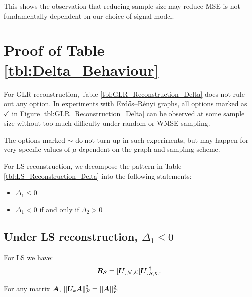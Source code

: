 This shows the observation that reducing sample size may reduce MSE is not fundamentally dependent on our choice of signal model.
\fi
\section{Proof of Table \ref{tbl:Delta_Behaviour}}
\label{app:table_delta_proof}
{\color{black}
For GLR reconstruction, Table \ref{tbl:GLR_Reconstruction_Delta} does not rule out any option. In experiments with Erdős–Rényi graphs, all options marked as $\checkmark$ in Figure \ref{tbl:GLR_Reconstruction_Delta} can be observed at some sample size without too much difficulty under random or WMSE sampling.

The options marked $\sim$ do not turn up in such experiments, but may happen for very specific values of $\mu$ dependent on the graph and sampling scheme.

For LS reconstruction, we decompose the pattern in Table \ref{tbl:LS_Reconstruction_Delta} into the following statements: 
\begin{itemize}
    \item $\Delta_{1} \leq 0$
    \item $\Delta_{1} < 0 $ if and only if $ \Delta_{2} > 0$
\end{itemize}
}
\subsection{Under LS reconstruction, \texorpdfstring{$\Delta_{1} \leq 0$}{\textDelta\textoneinferior =< 0}}
\label{app:delta_1_non_positive}
For LS we have:  \[\matr{R}_{\set{S}} = \matrsubU{N}[\matr{U}]_{\set{S},\set{K}}^{\dagger}.\]

\iffalse
\begin{lemma}
\label{lemma:frob_orthog}
    For any matrix $\bm{A}$, $||\bm{U}_{k}\bm{A}||^{2}_{F} = ||\bm{A}||^{2}_{F}$
\end{lemma}

